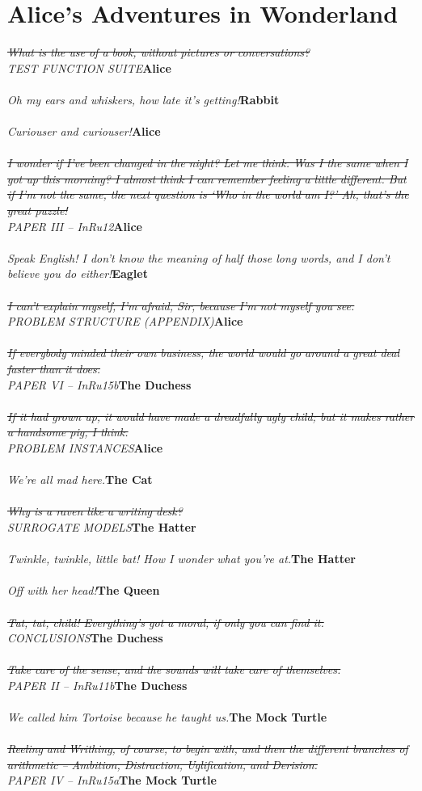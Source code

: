 \documentclass{hi-thesis}
\renewcommand{\quote}[2]{\noindent \emph{#2}\hfill{\bf #1}\\\\}
\begin{document}
\pagestyle{plain} 


\chapter*{Alice's Adventures in Wonderland}

\quote{Alice}{\st{What is the use of a book, without pictures or conversations?}\\TEST FUNCTION SUITE} 
\quote{Rabbit}{Oh my ears and whiskers, how late it's getting!}
\quote{Alice}{Curiouser and curiouser!}
\quote{Alice}{\st{I wonder if I've been changed in the night? Let me think. Was 
I the same when I got up this morning? I almost think I can remember feeling a 
little different. But if I'm not the same, the next question is `Who in the 
world am I?' Ah, that's the great puzzle!}\\PAPER III -- InRu12}
\quote{Eaglet}{Speak English! I don't know the meaning of half those long 
words, and I don't believe you do either!}
\quote{Alice}{\st{I can't explain myself, I'm afraid, Sir, because I'm not myself you see.}\\PROBLEM STRUCTURE (APPENDIX)}
\quote{The Duchess}{\st{If everybody minded their own business, the world would 
go around a great deal faster than it does.} \\ PAPER VI -- InRu15b}
\quote{Alice}{\st{If it had grown up, it would have made a dreadfully ugly child; but it makes rather a handsome pig, I think.}\\PROBLEM INSTANCES}
\quote{The Cat}{We're all mad here.}
\quote{The Hatter}{ \st{Why is a raven like a writing desk?}\\SURROGATE MODELS}
\quote{The Hatter}{Twinkle, twinkle, little bat! How I wonder what you're at.}
\quote{The Queen}{Off with her head!}
\quote{The Duchess}{\st{Tut, tut, child! Everything's got a moral, if only you can find it.}\\CONCLUSIONS}
\quote{The Duchess}{\st{Take care of the sense, and the sounds will take care 
of themselves.}\\PAPER II -- InRu11b}
\quote{The Mock Turtle}{We called him Tortoise because he taught us.}
\quote{The Mock Turtle}{\st{Reeling and Writhing, of course, to begin with, 
and then the different branches of arithmetic -- Ambition, Distraction, 
Uglification, and Derision.}\\PAPER IV -- InRu15a}
\end{document}
